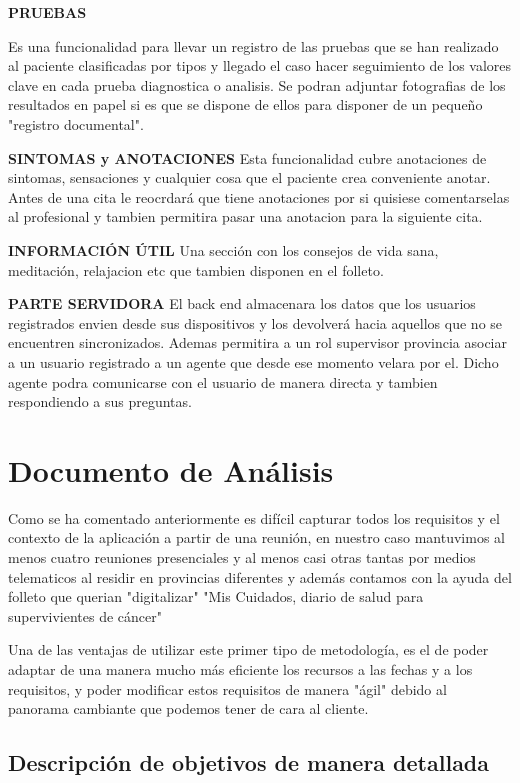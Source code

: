 \documentclass[../pfc.tex]{subfiles}
\begin{document}
	\textbf{PRUEBAS}
	
	Es una funcionalidad para llevar un registro de las pruebas que se han realizado al paciente clasificadas por tipos y llegado el caso hacer seguimiento de los valores clave en cada prueba diagnostica o analisis. Se podran adjuntar fotografias de los resultados en papel si es que se dispone de ellos para disponer de un pequeño "registro documental".
	
	
	\textbf{SINTOMAS y ANOTACIONES}
	Esta funcionalidad cubre anotaciones de sintomas, sensaciones y cualquier cosa que el paciente crea conveniente anotar. Antes de una cita le reocrdará que tiene anotaciones por si quisiese comentarselas al profesional y tambien permitira pasar una anotacion para la siguiente cita.
	
	
	\textbf{INFORMACIÓN ÚTIL}
	Una sección con los consejos de vida sana, meditación, relajacion etc que tambien disponen en el folleto. 
	
	\textbf{PARTE SERVIDORA}
	El back end almacenara los datos que los usuarios registrados envien desde sus dispositivos y los devolverá hacia aquellos que no se encuentren sincronizados. Ademas permitira a un rol supervisor provincia asociar a un usuario registrado a un agente que desde ese momento velara por el. Dicho agente podra comunicarse con el usuario de manera directa y tambien respondiendo a sus preguntas.  
	
	
	\section{Documento de Análisis}
	
			
	Como se ha comentado anteriormente es difícil capturar todos los requisitos y el contexto de la aplicación a partir de una reunión, en nuestro caso mantuvimos al menos cuatro reuniones presenciales y al menos casi otras tantas por medios telematicos al residir en provincias diferentes y además contamos con la ayuda del folleto que querian "digitalizar" "Mis Cuidados, diario de salud para supervivientes de cáncer"
			
	Una de las ventajas de utilizar este primer tipo de metodología, es el de poder adaptar de una manera mucho más eficiente los recursos a las fechas y a los requisitos, y poder modificar estos requisitos de manera "ágil" debido al panorama cambiante que podemos tener de cara al cliente.
			
		
	\subsection{Descripción de objetivos de manera detallada}
	
\end{document}
